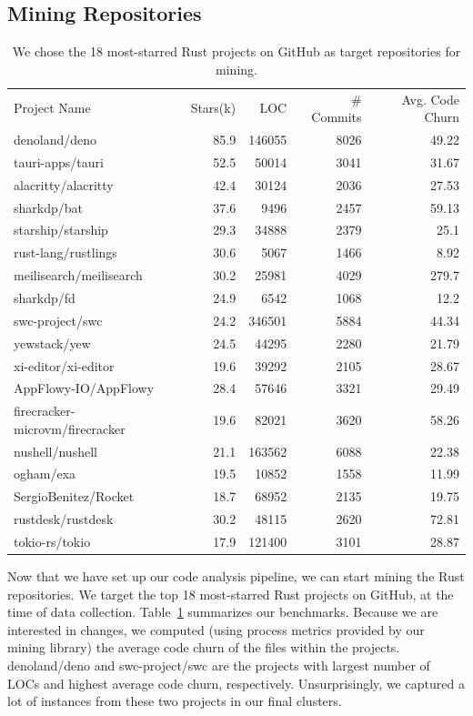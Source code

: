 \subsection{\label{sec:mining_repositories}Mining Repositories}
\label{sec:mining}

\begin{table}
\caption{\label{table:repos} We chose the 18 most-starred Rust projects on GitHub as target repositories for mining.
}
\begin{tabular}{l r r r r}
    Project Name & Stars(k) & LOC & \# Commits & Avg. Code Churn \\
    denoland/deno & 85.9 & 146055 & 8026 & 49.22 \\
    tauri-apps/tauri & 52.5 & 50014 & 3041 & 31.67 \\
    alacritty/alacritty & 42.4 & 30124 & 2036 & 27.53 \\
    sharkdp/bat & 37.6 & 9496 & 2457 & 59.13 \\
    starship/starship & 29.3 & 34888 & 2379 & 25.1 \\
    rust-lang/rustlings & 30.6 & 5067 & 1466 & 8.92 \\
    meilisearch/meilisearch & 30.2 & 25981 & 4029 & 279.7 \\
    sharkdp/fd & 24.9 & 6542 & 1068 & 12.2 \\
    swc-project/swc & 24.2 & 346501 & 5884 & 44.34 \\
    yewstack/yew & 24.5 & 44295 & 2280 & 21.79 \\
    xi-editor/xi-editor & 19.6 & 39292 & 2105 & 28.67 \\
    AppFlowy-IO/AppFlowy & 28.4 & 57646 & 3321 & 29.49 \\
    firecracker-microvm/firecracker & 19.6 & 82021 & 3620 & 58.26 \\
    nushell/nushell & 21.1 & 163562 & 6088 & 22.38 \\
    ogham/exa & 19.5 & 10852 & 1558 & 11.99 \\
    SergioBenitez/Rocket & 18.7 & 68952 & 2135 & 19.75 \\
    rustdesk/rustdesk & 30.2 & 48115 & 2620 & 72.81 \\
    tokio-rs/tokio & 17.9 & 121400 & 3101 & 28.87 
\end{tabular}
\end{table}
   

Now that we have set up our code analysis pipeline, we can start mining the Rust repositories. We target the top 18 most-starred Rust projects on GitHub, at the time of data collection. Table~\ref{table:repos} summarizes our benchmarks. Because we are interested in changes, we computed (using process metrics provided by our mining library) the average code churn of the files within the projects. denoland/deno and swc-project/swc are the projects with largest number of LOCs and highest average code churn, respectively. Unsurprisingly, we captured a lot of instances from these two projects in our final clusters.

